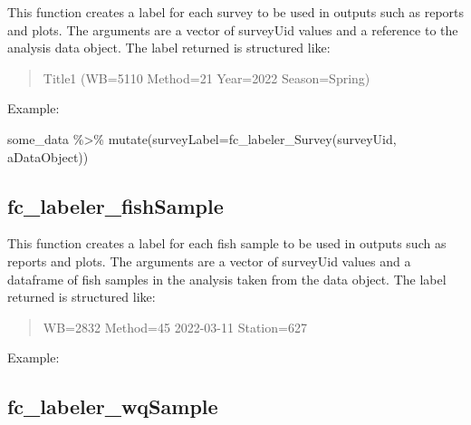 \documentclass[
  letterpaper,
  DIV=11,
  numbers=noendperiod]{scrreprt}
\newenvironment{Shaded}{\begin{snugshade}}{\end{snugshade}}
\newcommand{\AttributeTok}[1]{\textcolor[rgb]{0.40,0.45,0.13}{#1}}
\newcommand{\FunctionTok}[1]{\textcolor[rgb]{0.28,0.35,0.67}{#1}}
\newcommand{\NormalTok}[1]{\textcolor[rgb]{0.00,0.23,0.31}{#1}}
\newcommand{\SpecialCharTok}[1]{\textcolor[rgb]{0.37,0.37,0.37}{#1}}
\begin{document}
This function creates a label for each survey to be used in outputs such
as reports and plots. The arguments are a vector of surveyUid values and
a reference to the analysis data object. The label returned is
structured like:

\begin{quote}
Title1 (WB=5110 \textbar{} Method=21 \textbar{} Year=2022 \textbar{}
Season=Spring)
\end{quote}

Example:

\begin{Shaded}
\begin{Highlighting}[]
\NormalTok{some\_data }\SpecialCharTok{\%\textgreater{}\%}
  \FunctionTok{mutate}\NormalTok{(}\AttributeTok{surveyLabel=}\FunctionTok{fc\_labeler\_Survey}\NormalTok{(surveyUid, aDataObject))}
\end{Highlighting}
\end{Shaded}

\subsection{fc\_labeler\_fishSample}\label{fc_labeler_fishsample}

This function creates a label for each fish sample to be used in outputs
such as reports and plots. The arguments are a vector of surveyUid
values and a dataframe of fish samples in the analysis taken from the
data object. The label returned is structured like:

\begin{quote}
WB=2832 \textbar{} Method=45 \textbar{} 2022-03-11 \textbar{}
Station=627
\end{quote}

Example:

\begin{Shaded}
\end{Shaded}

\subsection{fc\_labeler\_wqSample}\label{fc_labeler_wqsample}
\end{document}
